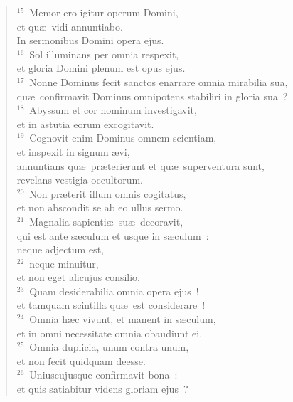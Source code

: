 \begin{verse}${}^{15}$~Memor ero igitur operum Domini,\\ et qu\ae\ vidi annuntiabo.\\ In sermonibus Domini opera ejus.\\
${}^{16}$~Sol illuminans per omnia respexit,\\ et gloria Domini plenum est opus ejus.\\
${}^{17}$~Nonne Dominus fecit sanctos enarrare omnia mirabilia sua,\\ qu\ae\ confirmavit Dominus omnipotens stabiliri in gloria sua~?\\
${}^{18}$~Abyssum et cor hominum investigavit,\\ et in astutia eorum excogitavit.\\
${}^{19}$~Cognovit enim Dominus omnem scientiam,\\ et inspexit in signum \ae vi,\\ annuntians qu\ae\ pr\ae terierunt et qu\ae\ superventura sunt,\\ revelans vestigia occultorum.\\
${}^{20}$~Non pr\ae terit illum omnis cogitatus,\\ et non abscondit se ab eo ullus sermo.\\
${}^{21}$~Magnalia sapienti\ae\ su\ae\ decoravit,\\ qui est ante s\ae culum et usque in s\ae culum~:\\ neque adjectum est,\\
${}^{22}$~neque minuitur,\\ et non eget alicujus consilio.\\
${}^{23}$~Quam desiderabilia omnia opera ejus~!\\ et tamquam scintilla qu\ae\ est considerare~!\\
${}^{24}$~Omnia h\ae c vivunt, et manent in s\ae culum,\\ et in omni necessitate omnia obaudiunt ei.\\
${}^{25}$~Omnia duplicia, unum contra unum,\\ et non fecit quidquam deesse.\\
${}^{26}$~Uniuscujusque confirmavit bona~:\\ et quis satiabitur videns gloriam ejus~?\end{verse}


